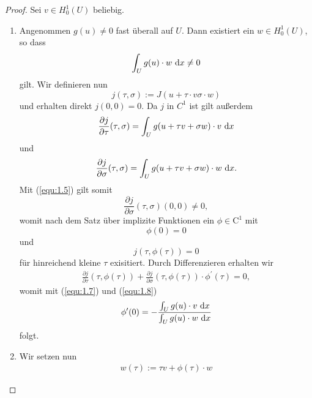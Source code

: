 \begin{proof}
Sei $v \in H_0^1(U)$ beliebig.
\begin{enumerate}

\item[\textbf{(1)}]
Angenommen $g(u) \neq 0$ fast überall auf $U$.
Dann existiert ein $w \in H_0^1(U)$, so dass
\begin{equation}\label{equ:1.5}
\int_U g(u) \cdot w \ \text{\rmfamily d} x \neq 0
\end{equation}
gilt.
Wir definieren nun
\begin{equation}\label{equ:1.6}
j(\tau,\sigma) 
:= J(u + \tau \cdot v \sigma \cdot w)
\end{equation}
und erhalten direkt $j(0,0) = 0$.
Da $j$ in $C^1$ ist gilt außerdem
\begin{equation}\label{equ:1.7}
\frac{\partial j}{\partial \tau}(\tau,\sigma)
= 
\int_U g( u + \tau v + \sigma w) \cdot v \ \text{\rmfamily d} x
\end{equation}
und
\begin{equation}\label{equ:1.8}
\frac{\partial j}{\partial \sigma}(\tau,\sigma)
= 
\int_U g( u + \tau v + \sigma w) \cdot w \ \text{\rmfamily d} x.
\end{equation} 
Mit (\ref{equ:1.5}) gilt somit 
\begin{equation} \label{equ:1.9}
\frac{\partial j}{\partial \sigma}(\tau,\sigma)(0,0) \neq 0,
\end{equation}
womit nach dem Satz über implizite Funktionen ein $ \phi \in \mathrm{C}^1 $ mit
\begin{equation}\label{equ:1.10}
\phi(0) = 0
\end{equation}
und 
\begin{equation}\label{equ:1.11}
j(\tau, \phi(\tau)) = 0 
\end{equation}
für hinreichend kleine $\tau$ exisitiert.
Durch Differenzieren erhalten wir 
\begin{align*}
\frac{\partial j}{\partial \tau }(\tau, \phi(\tau)) + 
\frac{\partial j}{\partial \sigma}(\tau, \phi(\tau)) \cdot \phi^\prime (\tau) = 0,
\end{align*}
womit mit (\ref{equ:1.7}) und (\ref{equ:1.8})
\begin{equation}\label{equ:1.12}
\phi^\prime(0) 
=
-\frac{\int_U g(u) \cdot v \ \text{\rmfamily d} x}{\int_U g(u) \cdot w \ \text{\rmfamily d} x}
\end{equation}
folgt.
\item[\textbf{(2)}]
Wir setzen nun
\begin{align*}
w(\tau) := \tau v + \phi(\tau) \cdot w
\end{align*}

\end{enumerate}
\end{proof}
